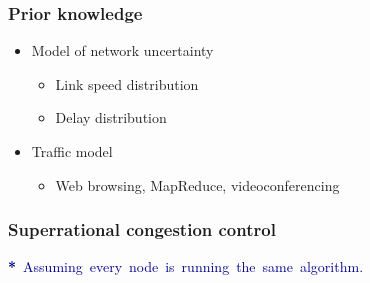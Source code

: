 \documentclass[svgnames]{beamer}
\newcommand{\ssline}{\vspace{8 pt}}
\begin{document}
\begin{frame}
\frametitle{Prior knowledge}

\begin{itemize}

\Large

\item Model of network uncertainty

\begin{itemize}
\item Link speed distribution
\item Delay distribution
\end{itemize}

\item Traffic model

\begin{itemize}
\item Web browsing, MapReduce, videoconferencing
\end{itemize}

\end{itemize}

\end{frame}

%
%
%
%
%
%
%
%

\begin{frame}
\frametitle{Superrational congestion control}

\begin{centering}

\ssline
\ssline
\ssline

\end{centering}

\Large \noindent \hspace{-.5cm} \mbox{\textcolor{DarkBlue}{\textbf{*} Assuming every node is running the same algorithm.}}

\end{frame}
\end{document}
